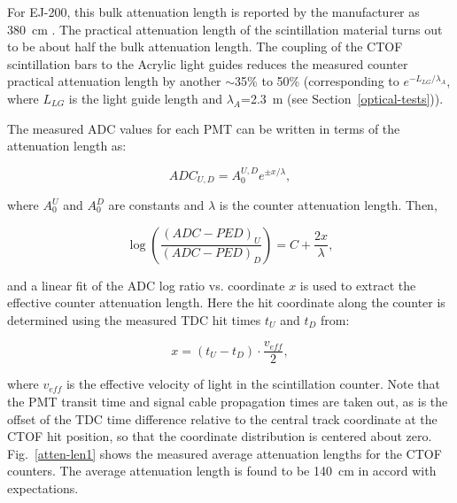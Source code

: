 \documentclass{elsart}
\begin{document}
For EJ-200, this bulk attenuation length is reported by the manufacturer as 380~cm
\cite{scint-spec}. The practical attenuation length of the scintillation material turns out to 
be about half the bulk attenuation length. The coupling of the CTOF scintillation bars to the 
Acrylic light guides reduces the measured counter practical attenuation length by another 
$\sim$35\% to 50\% (corresponding to $e^{-L_{LG}/\lambda_A}$, where $L_{LG}$ is the light guide 
length and $\lambda_A$=2.3~m (see Section~\ref{optical-tests})).

The measured ADC values for each PMT can be written in terms of the attenuation length as:

\begin{equation}
\label{al-adc}
ADC_{U,D} = A_0^{U,D} e^{\pm x/\lambda},
\end{equation}

\noindent
where $A_0^U$ and $A_0^D$ are constants and $\lambda$ is the counter attenuation length. Then,

\begin{equation}
\label{linear}
\log \left( \frac{(ADC-PED)_U}{(ADC-PED)_D} \right ) = C + \frac{2x}{\lambda}, 
\end{equation}

\noindent
and a linear fit of the ADC log ratio vs. coordinate $x$ is used to extract the effective counter attenuation
length. Here the hit coordinate along the counter is determined using the measured TDC hit times $t_U$
and $t_D$ from:

\begin{equation}
\label{coor}
x = (t_U - t_D) \cdot \frac{v_{eff}}{2},
\end{equation}

\noindent
where $v_{eff}$ is the effective velocity of light in the scintillation counter. Note that the PMT transit
time and signal cable propagation times are taken out, as is the offset of the TDC time difference
relative to the central track coordinate at the CTOF hit position, so that the coordinate distribution is
centered about zero. Fig.~\ref{atten-len1} shows the measured average attenuation lengths for the
CTOF counters. The average attenuation length is found to be 140~cm in accord with expectations. 
\end{document}
